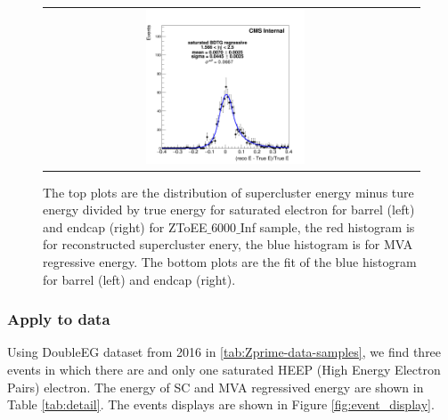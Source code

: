 \begin{figure}[bh]
\begin{center}
\begin{tabular}{cc}
      \includegraphics[width=0.45\textwidth]{chapters/Zprime/Saturation/images/FlatPt/ZToEE_check/6000_Inf/fit_BDTG_Barrel_Endcap_E_reg_s.png}
    \end{tabular}
    \caption{ The top plots are the distribution of supercluster energy minus ture energy divided by true energy for saturated electron for barrel (left) and endcap (right) for ZToEE$\_$6000$\_$Inf sample, the red histogram is for reconstructed supercluster enery, the blue histogram is for MVA regressive energy. The bottom plots are the fit of the blue histogram for barrel (left) and endcap (right).}
    \label{fig:ZToEE_6000_Inf_B_E}
  \end{center}
\end{figure}


\subsubsection{Apply to data}

Using DoubleEG dataset from 2016 in \ref{tab:Zprime-data-samples}, we find three events in which there are and only one saturated HEEP (High Energy Electron Pairs) electron. The energy of SC and MVA regressived energy are shown in Table  \ref{tab:detail}. The events displays are shown in Figure \ref{fig:event_display}.

\begin{table}[!h]
  \begin{center}
\smallskip\noindent
{}
    \caption{Detail of saturated HEEP electrons.}
    \label{tab:detail}
  \end{center}
\end{table}

